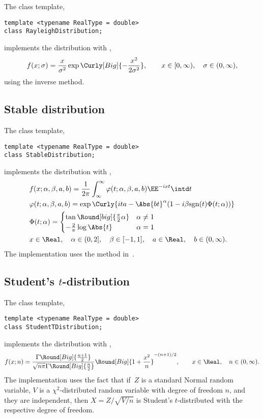 The class template,
\begin{verbatim}
template <typename RealType = double>
class RayleighDistribution;
\end{verbatim}
implements the distribution with \pdf,
\begin{equation*}
  f(x;\sigma) =
  \frac{x}{\sigma^2}\exp\Curly[Big]{-\frac{x^2}{2\sigma^2}},\qquad
  x \in [0, \infty),\quad \sigma \in (0, \infty),
\end{equation*}
using the inverse method.

\subsection{Stable distribution}
\label{sub:Stable distribution}

The class template,
\begin{verbatim}
template <typename RealType = double>
class StableDistribution;
\end{verbatim}
implements the distribution with \pdf,
\begin{align*}
  &f(x;\alpha,\beta,a,b) =
  \frac{1}{2\pi}\int_{\infty}^{\infty}
  \varphi(t;\alpha,\beta,a,b)\EE^{-ixt}\intd t\\
  &\varphi(t;\alpha,\beta,a,b) =
  \exp\Curly{
    ita - \Abs{bt}^{\alpha}(1 - i\beta\mathrm{sgn}(t)\Phi(t;\alpha))} \\
  &\Phi(t;\alpha) = \begin{cases}
    \tan\Round[big]{\frac{\pi}{2}\alpha} & \alpha \ne 1 \\
    -\frac{2}{\pi}\log\Abs{t}            & \alpha = 1
  \end{cases} \\
  & x \in \Real,\quad
  \alpha \in (0, 2],\quad \beta \in [-1, 1],\quad
  a \in \Real,\quad b \in (0, \infty).
\end{align*}
The implementation uses the method in~\cite{Chambers:1976dv}.

\subsection{Student's \texorpdfstring{$t$}{t}-distribution}
\label{sub:Student's t-distribution}

The class template,
\begin{verbatim}
template <typename RealType = double>
class StudentTDistribution;
\end{verbatim}
implements the distribution with \pdf,
\begin{equation*}
  f(x;n) =
  \frac{\Gamma\Round[Big]{\frac{n + 1}{2}}}
  {\sqrt{n\pi}\Gamma\Round[Big]{\frac{n}{2}}}
  \Round[Big]{1 + \frac{x^2}{n}}^{-(n + 1)/2},\qquad
  x \in \Real,\quad n \in (0, \infty).
\end{equation*}
The implementation uses the fact that if~$Z$ is a standard Normal random
variable, $V$ is a $\chi^2$-distributed random variable with degree of freedom
$n$, and they are independent, then $X = Z/\sqrt{V / n}$ is Student's
$t$-distributed with the respective degree of freedom.

